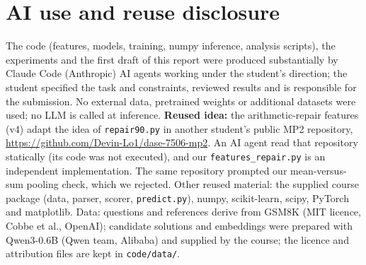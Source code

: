 \documentclass[10pt,a4paper]{article}
\begin{document}
\section{AI use and reuse disclosure}
The code (features, models, training, numpy inference, analysis scripts), the experiments and the first draft of this report were produced substantially by Claude Code (Anthropic) AI agents working under the student's direction; the student specified the task and constraints, reviewed results and is responsible for the submission. No external data, pretrained weights or additional datasets were used; no LLM is called at inference. \textbf{Reused idea:} the arithmetic-repair features (v4) adapt the idea of \texttt{repair90.py} in another student's public MP2 repository, \url{https://github.com/Devin-Lo1/dase-7506-mp2}. An AI agent read that repository statically (its code was not executed), and our \texttt{features\_repair.py} is an independent implementation. The same repository prompted our mean-versus-sum pooling check, which we rejected. Other reused material: the supplied course package (data, parser, scorer, \texttt{predict.py}), numpy, scikit-learn, scipy, PyTorch and matplotlib. Data: questions and references derive from GSM8K (MIT licence, Cobbe et al., OpenAI); candidate solutions and embeddings were prepared with Qwen3-0.6B (Qwen team, Alibaba) and supplied by the course; the licence and attribution files are kept in \texttt{code/data/}.
\end{document}
